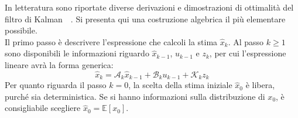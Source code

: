 \documentclass[12pt,a4paper,openright,twoside]{book}
\begin{document}
In letteratura sono riportate diverse derivazioni e dimostrazioni di ottimalità del filtro di Kalman~\cite[pp.~107-113]{10.5555/2823801}~\cite{10.48550/arXiv.1910.03558}. Si presenta qui una costruzione algebrica il più elementare possibile. \\

Il primo passo è descrivere l'espressione che calcoli la stima $\hat{x}_k$. Al passo $k\geq 1$ sono disponibili le informazioni riguardo $\hat{x}_{k-1}$, $u_{k-1}$ e $z_k$, per cui l'espressione lineare avrà la forma generica:
\begin{equation} \label{eq:generic-estimate}
\hat{x}_k=\mathcal{A}_k\hat{x}_{k-1}+\mathcal{B}_ku_{k-1}+\mathcal{K}_kz_k
\end{equation}
Per quanto riguarda il passo $k=0$, la scelta della stima iniziale $\hat{x}_0$ è libera, purché sia deterministica. Se si hanno informazioni sulla distribuzione di $x_0$, è consigliabile scegliere $\hat{x}_0=\mathbb{E}[x_0]$. \\
\end{document}
